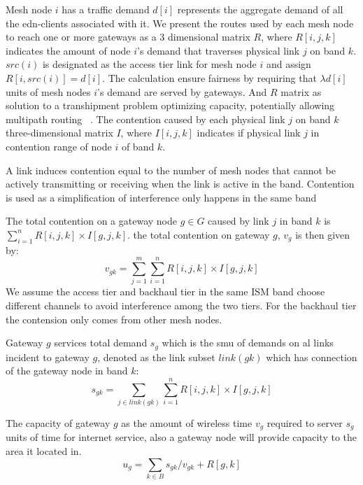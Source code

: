 Mesh node $i$ has a traffic demand $d[i]$ represents the aggregate demand of all the edn-clients associated with it. 
We present the routes used by each mesh node to reach one or more gateways as a 3 dimensional matrix $R$, where $R[i,j,k]$ indicates the amount of node $i$'s demand that traverses physical link $j$ on band $k$. 
$src(i)$ is designated as the access tier link for mesh node $i$ and assign $R[i,src(i)]=d[i]$. The calculation ensure fairness by requiring that $\lambda d[i]$ units of mesh nodes $ i$'s demand are served by gateways.
And $R$ matrix as solution to a transhipment problem optimizing capacity, potentially allowing multipath routing ~\cite{robinson2008adding}.
The contention caused by each physical link $j$ on band $k$ three-dimensional matrix $I$, where $I[i,j,k]$ indicates if physical link $j$  in contention range of node $i$ of band $k$.

A link induces contention equal to the number of mesh nodes that cannot be actively transmitting or receiving when the link is active in the band.
Contention is used as a simplification of interference only happens in the same band 

The total contention on a gateway node $g\in G$ caused by link $j$ in band $k$ is $\sum_{i=1}^nR[i,j,k] \times I[g,j,k]$. the total contention on gateway $g$, $v_g$ is then given by:
\begin{equation}
\label{eq:contention}
v_{gk}=\sum_{j=1}^m \sum_{i=1}^n R[i,j,k]\times I[g,j,k]
\end{equation}
We assume the access tier and backhaul tier in the same ISM band choose different channels to avoid interference among the two tiers. For the backhaul tier the contension only comes from other mesh nodes.

Gateway $g$ services total demand $s_g$ which is the smu of demands on al links incident to gateway $g$, denoted as the link subset $link(gk)$ which has connection of the gateway node in band $k$:
\begin{equation}
s_{gk}=\sum_{j\in link(gk)} \sum_{i=1}^n R[i,j,k]\times I[g,j,k]
\end{equation}
 
The capacity of gateway $g$ as the amount of wireless time $v_g$ required to server $s_g$ units of time for internet service, also a gateway node will provide capacity to the area it located in.
\begin{equation}
u_{g}=\sum_{k\in B} s_{gk}/v_{gk}+R[g,k]
\end{equation}

